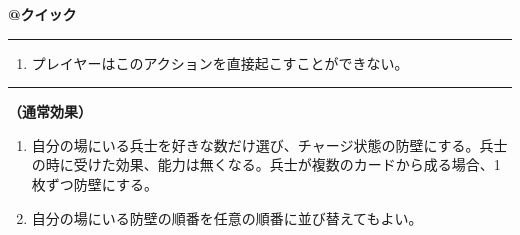 \documentclass[twocolumn,a5paper,papersize,10pt]{jarticle}
\begin{document}
\vspace{-1zh}
\begin{tcolorbox}[title={\small\bf【Action】幻影}{\scriptsize （誘発）}]

{\scriptsize\bf @クイック }

\vspace{1mm} %
\hrule height 0.1mm depth 0mm width 62mm %
\vspace{1mm} %


\vspace{-1zh}%
\begin{enumerate}
\renewcommand{\labelenumi}{※}
\setlength{\leftskip}{-0.3cm}
\setlength{\itemsep}{0pt} %
\setlength{\parskip}{0pt} %

\item プレイヤーはこのアクションを直接起こすことができない。

\vspace{-3mm}%
\end{enumerate}
\vspace{-2mm} %
\vspace{1zh}%
\vspace{1mm} %
\hrule height 0.1mm depth 0mm width 62mm %
\vspace{1mm} %

{\bf（通常効果）}


\vspace{-1zh}%
\begin{enumerate}
\setlength{\leftskip}{-0.3cm}
\setlength{\parskip}{0pt} %

\item 自分の場にいる兵士を好きな数だけ選び、チャージ状態の防壁にする。兵士の時に受けた効果、能力は無くなる。兵士が複数のカードから成る場合、1枚ずつ防壁にする。

\item 自分の場にいる防壁の順番を任意の順番に並び替えてもよい。
\vspace{-1zh}%
\end{enumerate}

\vspace{1mm} %
\end{tcolorbox}

\vspace{-1zh}
  
 
\end{document}
